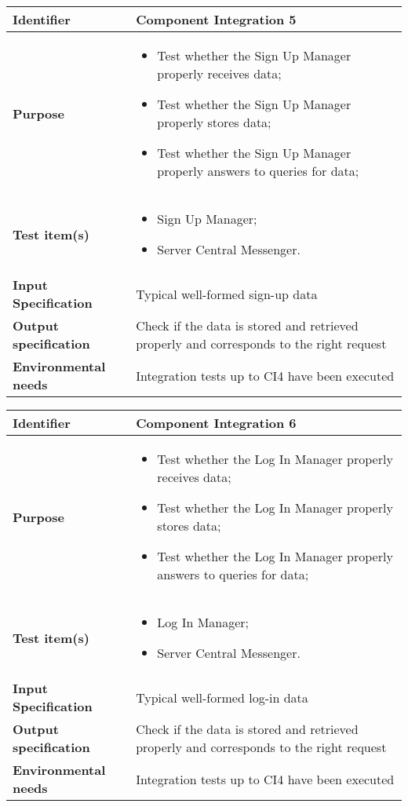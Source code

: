 \begin{center}
\begin{tabular}{lp{}}
\toprule
\textbf{Identifier}		&	Component Integration 5\\
\midrule
\textbf{Purpose}		&	\begin{itemize}
					\item Test whether the Sign Up Manager properly receives data;
					\item Test whether the Sign Up Manager properly stores data;
					\item Test whether the Sign Up Manager properly answers to queries for data;
					\end{itemize}	\\
\textbf{Test item(s)}	&	\begin{itemize}
					\item Sign Up Manager;
					\item Server Central Messenger.
					\end{itemize}	\\
\textbf{Input Specification}	&	Typical well-formed sign-up data\\
\textbf{Output specification}	&	Check if the data is stored and retrieved properly and corresponds to the right request\\
\textbf{Environmental needs}	&	Integration tests up to CI4 have been executed\\
\bottomrule
\end{tabular}
\end{center}


\begin{center}
\begin{tabular}{lp{}}
\toprule
\textbf{Identifier}		&	Component Integration 6\\
\midrule
\textbf{Purpose}		&	\begin{itemize}
					\item Test whether the Log In Manager properly receives data;
					\item Test whether the Log In Manager properly stores data;
					\item Test whether the Log In Manager properly answers to queries for data;
					\end{itemize}	\\
\textbf{Test item(s)}	&	\begin{itemize}
					\item Log In Manager;
					\item Server Central Messenger.
					\end{itemize}	\\
\textbf{Input Specification}	&	Typical well-formed log-in data\\
\textbf{Output specification}	&	Check if the data is stored and retrieved properly and corresponds to the right request\\
\textbf{Environmental needs}	&	Integration tests up to CI4 have been executed\\
\bottomrule
\end{tabular}
\end{center}

